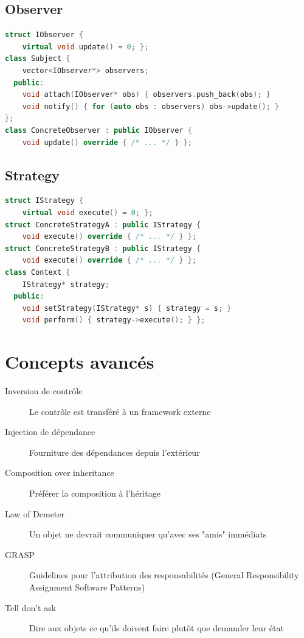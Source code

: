 \documentclass{article}
\begin{document}
\begin{multicols*}{3}
\subsection*{Observer}
\begin{lstlisting}[language=C++]
struct IObserver {
    virtual void update() = 0; };
class Subject {
    vector<IObserver*> observers;
  public:
    void attach(IObserver* obs) { observers.push_back(obs); }
    void notify() { for (auto obs : observers) obs->update(); }
};
class ConcreteObserver : public IObserver {
    void update() override { /* ... */ } };
\end{lstlisting}

\subsection*{Strategy}
\begin{lstlisting}[language=C++]
struct IStrategy {
    virtual void execute() = 0; };
struct ConcreteStrategyA : public IStrategy {
    void execute() override { /* ... */ } };
struct ConcreteStrategyB : public IStrategy {
    void execute() override { /* ... */ } };
class Context {
    IStrategy* strategy;
  public:
    void setStrategy(IStrategy* s) { strategy = s; }
    void perform() { strategy->execute(); } };
\end{lstlisting}

\section*{Concepts avancés}
\begin{description}
\item[Inversion de contrôle] Le contrôle est transféré à un framework externe
\item[Injection de dépendance] Fourniture des dépendances depuis l'extérieur
\item[Composition over inheritance] Préférer la composition à l'héritage
\item[Law of Demeter] Un objet ne devrait communiquer qu'avec ses "amis" immédiats
\item[GRASP] Guidelines pour l'attribution des responsabilités (General Responsibility Assignment Software Patterns)
\item[Tell don't ask] Dire aux objets ce qu'ils doivent faire plutôt que demander leur état
\end{description}


\end{multicols*}
\end{document}
